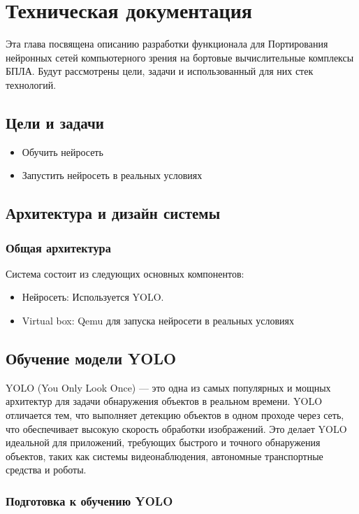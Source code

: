 \chapter{Техническая документация}
\label{ch:documentation}

    Эта глава посвящена описанию разработки функционала для Портирования нейронных сетей компьютерного зрения на бортовые вычислительные комплексы БПЛА.  Будут рассмотрены цели, задачи и использованный для них стек технологий.
    
    \section{Цели и задачи}
    \begin{itemize}
        \item Обучить нейросеть
        \item Запустить нейросеть в реальных условиях
    \end{itemize}

    \section{Архитектура и дизайн системы}
    
    \subsection{Общая архитектура}
    Система состоит из следующих основных компонентов:
    \begin{itemize}
        \item Нейросеть: Используется YOLO.
        \item Virtual box: Qemu для запуска нейросети в реальных условиях
    \end{itemize}

    \section{Обучение модели YOLO}
    YOLO (You Only Look Once) — это одна из самых популярных и мощных архитектур для задачи обнаружения объектов в реальном времени. YOLO отличается тем, что выполняет детекцию объектов в одном проходе через сеть, что обеспечивает высокую скорость обработки изображений. Это делает YOLO идеальной для приложений, требующих быстрого и точного обнаружения объектов, таких как системы видеонаблюдения, автономные транспортные средства и роботы.

    \subsection{Подготовка к обучению YOLO}
    
